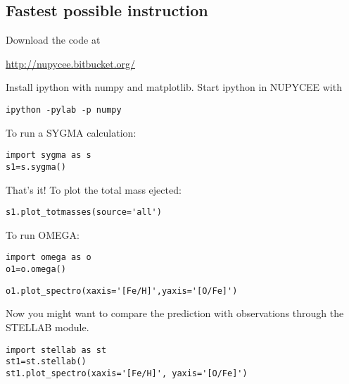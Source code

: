 
\subsection{Fastest possible instruction}

Download the code at

\url{http://nupycee.bitbucket.org/}

Install ipython with numpy and matplotlib.
Start ipython in NUPYCEE with

\begin{verbatim}
ipython -pylab -p numpy
\end{verbatim}

To run a SYGMA calculation:

\begin{verbatim}
import sygma as s
s1=s.sygma()
\end{verbatim}

That's it! To plot the total  mass ejected:

\begin{verbatim}
s1.plot_totmasses(source='all')	
\end{verbatim}


To run OMEGA:

\begin{verbatim}
import omega as o
o1=o.omega()
\end{verbatim}

\begin{verbatim}
o1.plot_spectro(xaxis='[Fe/H]',yaxis='[O/Fe]')
\end{verbatim}

Now you might want to compare the prediction with
observations through the STELLAB module.

\begin{verbatim}
import stellab as st
st1=st.stellab()
st1.plot_spectro(xaxis='[Fe/H]', yaxis='[O/Fe]')
\end{verbatim}





